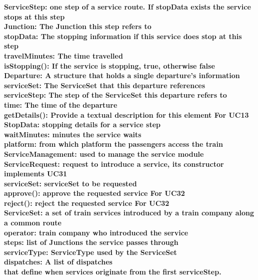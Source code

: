 \bf{ServiceStep}: one step of a service route. If stopData exists the service stops at this step\\

Junction: The Junction this step refers to\\
stopData: The stopping information if this service does stop at this step\\
travelMinutes: The time travelled\\
isStopping(): If the service is stopping, true, otherwise false\\

\bf{Departure}: A structure that holds a single departure's information\\
 
serviceSet: The ServiceSet that this departure references\\
serviceStep: The step of the ServiceSet this departure refers to\\
time: The time of the departure\\
getDetails(): Provide a textual description for this element
For UC13\\

\bf{StopData}: stopping details for a service step \\

waitMinutes: minutes the service waits\\
platform: from which platform the passengers access the train\\

\bf{ServiceManagement}: used to manage the service module\\

\bf{ServiceRequest}: request to introduce a service, its constructor implements UC31 \\

serviceSet: serviceSet to be requested\\
approve(): approve the requested service
For UC32\\
reject(): reject the requested service
For UC32\\

\bf{ServiceSet}: a set of train services introduced by a train company
along a common route\\

operator: train company who introduced the service\\
steps: list of Junctions the service passes through\\
serviceType: ServiceType used by the ServiceSet\\
dispatches: A list of dispatches\\
that define when services originate from the first serviceStep.\\

